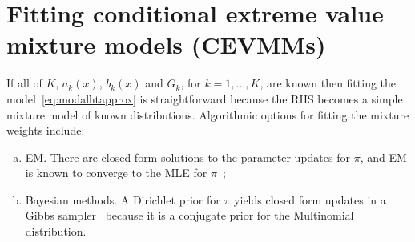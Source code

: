 \documentclass[11pt,twoside,openany]{book}
\numberwithin{Theorem}{chapter}
\numberwithin{Definition}{chapter}
\numberwithin{Lemma}{chapter}
\numberwithin{Algorithm}{chapter}
\numberwithin{equation}{chapter}
\begin{document}

\FloatBarrier

\section{Fitting conditional extreme value mixture models (CEVMMs)}

If all of $K$, $a_k(x)$, $b_k(x)$ and $G_k$, for $k=1,\ldots,K$, are known
then
fitting the model~\eqref{eq:modalhtapprox} is straightforward because
the RHS becomes a simple mixture model of known distributions.
Algorithmic options for fitting the mixture weights include:

\begin{enumerate}[(a)]
  \item EM. There are
    closed form solutions to the parameter updates for $\pi$, and EM is known
    to converge
    to the MLE for $\pi$~\citep{redner1984mixture};
  \item Bayesian methods. A Dirichlet prior for $\pi$ yields
    closed form updates in a Gibbs sampler~\citep{li2019tutorial} because
    it is a conjugate prior for the Multinomial distribution.
\end{enumerate}
\end{document}
